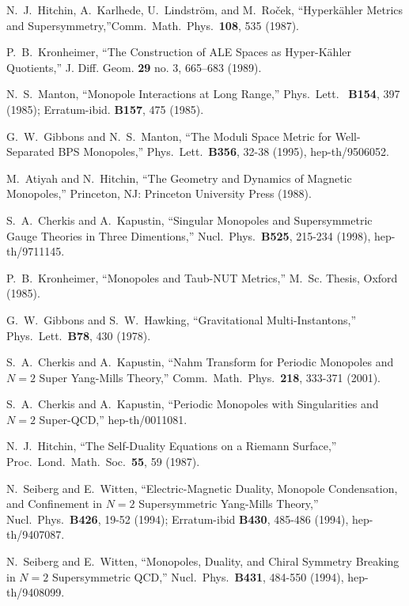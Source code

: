 \documentclass[a4paper,12pt, amsfonts, amssymb]{article}
\begin{document}
\begin{thebibliography}{99}
N.~J.~Hitchin, A.~Karlhede, U.~Lindstr\"om, and M.~Ro\v{c}ek, ``Hyperk\"ahler Metrics and Supersymmetry,''Comm.\ Math.\ Phys.\ {\bf 108}, 535 (1987).

P.~B.~Kronheimer, ``The Construction of ALE Spaces as Hyper-K\"ahler Quotients,'' J. Diff. Geom. {\bf 29}  no. 3, 665--683 (1989).

N.~S.~Manton, ``Monopole Interactions at Long Range,'' Phys.\ Lett.\ {\bf
B154}, 397 (1985); Erratum-ibid. {\bf B157}, 475 (1985).

G.~W.~Gibbons and N.~S.~Manton,
``The Moduli Space Metric for Well-Separated BPS Monopoles,''
Phys.\ Lett.\ {\bf B356}, 32-38 (1995), hep-th/9506052.

M.~Atiyah and N.~Hitchin, ``The Geometry and Dynamics of Magnetic
Monopoles,'' Princeton, NJ: Princeton University Press (1988).

S.~A.~Cherkis and A.~Kapustin, ``Singular Monopoles and Supersymmetric Gauge Theories in Three Dimentions,'' Nucl.\ Phys.\ {\bf B525}, 215-234 (1998), hep-th/9711145.

 P.~B.~Kronheimer, ``Monopoles and Taub-NUT Metrics,''
M.~Sc. Thesis, Oxford (1985).

 G.~W.~Gibbons and S.~W.~Hawking, ``Gravitational Multi-Instantons,'' Phys.\ Lett.\ {\bf B78}, 430 (1978).

S.~A.~Cherkis and A.~Kapustin, ``Nahm Transform for Periodic Monopoles
and $N=2$ Super Yang-Mills Theory,'' Comm.\ Math.\ Phys.\ {\bf 218}, 333-371 (2001).

S.~A.~Cherkis and A.~Kapustin, ``Periodic Monopoles
with Singularities and $N=2$ Super-QCD,'' hep-th/0011081.

N.~J.~Hitchin,
``The Self-Duality Equations on a Riemann Surface,''
Proc.\ Lond.\ Math.\ Soc.\ {\bf 55}, 59 (1987).


N.~Seiberg and E.~Witten, ``Electric-Magnetic Duality, Monopole Condensation, and Confinement in $N=2$ Supersymmetric Yang-Mills Theory,'' Nucl.\ Phys.\ {\bf B426}, 19-52 (1994); Erratum-ibid {\bf B430}, 485-486 (1994), hep-th/9407087.

N.~Seiberg and E.~Witten, ``Monopoles, Duality, and Chiral Symmetry Breaking
in $N=2$ Supersymmetric QCD,'' Nucl.\ Phys.\ {\bf B431}, 484-550 (1994), hep-th/9408099.


\end{thebibliography}
\end{document}
